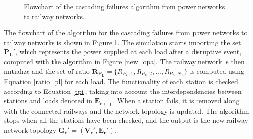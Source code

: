 \documentclass[review]{elsarticle}
\begin{document}
\begin{figure}[h]
	\centering
	\caption{Flowchart of the cascading failures algorithm from power networks to railway networks.}
	\label{algo_bet}
\end{figure}
The flowchart of the algorithm for the cascading failures from power networks to railway networks is shown in Figure \ref{algo_bet}. The simulation starts importing the set $\mathbf{P_L'}$, which represents the power supplied at each load after a disruptive event, computed with the algorithm in Figure \ref{new_opa}. The railway network is then initialize and the set of ratio $\mathbf{R_{P_L}} = \{ R_{P_L,1}, R_{P_L,2},...,R_{P_L,N_L}   \}$ is computed using Equation \ref{ratio_pl} for each load. The functionality of each station is checked according to Equation \ref{tpi}, taking into account the interdependencies between stations and loads denoted in $\mathbf{E_{r \leftarrow p}}$. When a station fails, it is removed along with the connected railways and the network topology is updated. The algorithm stops when all the stations have been checked, and the output is the new railway network topology $\mathbf{G_r'}=(\mathbf{V_r'},\mathbf{E_r'})$.
\end{document}
